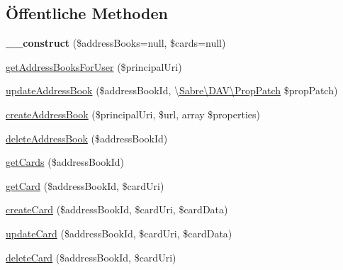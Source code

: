 \subsection*{Öffentliche Methoden}
\begin{DoxyCompactItemize}
\item 
\mbox{\label{class_sabre_1_1_card_d_a_v_1_1_backend_1_1_mock_a1b08b76751754be7b2f93150d9edd592}} 
{\bfseries \+\_\+\+\_\+construct} (\$address\+Books=null, \$cards=null)
\item 
\mbox{\hyperlink{class_sabre_1_1_card_d_a_v_1_1_backend_1_1_mock_a0ae33e7e452d483b0450754be445bc34}{get\+Address\+Books\+For\+User}} (\$principal\+Uri)
\item 
\mbox{\hyperlink{class_sabre_1_1_card_d_a_v_1_1_backend_1_1_mock_aa450469f499cdd00033137f6c9071ca1}{update\+Address\+Book}} (\$address\+Book\+Id, \textbackslash{}\mbox{\hyperlink{class_sabre_1_1_d_a_v_1_1_prop_patch}{Sabre\textbackslash{}\+D\+A\+V\textbackslash{}\+Prop\+Patch}} \$prop\+Patch)
\item 
\mbox{\hyperlink{class_sabre_1_1_card_d_a_v_1_1_backend_1_1_mock_aeaadfec8bfde286ae0db2af6d21e28b6}{create\+Address\+Book}} (\$principal\+Uri, \$url, array \$properties)
\item 
\mbox{\hyperlink{class_sabre_1_1_card_d_a_v_1_1_backend_1_1_mock_a942dc08fd06c6f1ebadfcf226b102ed0}{delete\+Address\+Book}} (\$address\+Book\+Id)
\item 
\mbox{\hyperlink{class_sabre_1_1_card_d_a_v_1_1_backend_1_1_mock_a82ab931451727b736b6a498d15e588c1}{get\+Cards}} (\$address\+Book\+Id)
\item 
\mbox{\hyperlink{class_sabre_1_1_card_d_a_v_1_1_backend_1_1_mock_addd43d557934b5d834d562269900646c}{get\+Card}} (\$address\+Book\+Id, \$card\+Uri)
\item 
\mbox{\hyperlink{class_sabre_1_1_card_d_a_v_1_1_backend_1_1_mock_a6f2d1d6c112993ecbd728d382214d692}{create\+Card}} (\$address\+Book\+Id, \$card\+Uri, \$card\+Data)
\item 
\mbox{\hyperlink{class_sabre_1_1_card_d_a_v_1_1_backend_1_1_mock_ae3df244681bdd69bf887496c2223bace}{update\+Card}} (\$address\+Book\+Id, \$card\+Uri, \$card\+Data)
\item 
\mbox{\hyperlink{class_sabre_1_1_card_d_a_v_1_1_backend_1_1_mock_a20a607167096ba3a163823f1113afd86}{delete\+Card}} (\$address\+Book\+Id, \$card\+Uri)
\end{DoxyCompactItemize}
